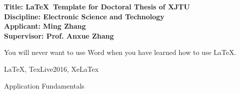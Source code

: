 \vskip-50mm
{\bfseries \xiaosi
	\noindent Title: \LaTeX~Template for Doctoral Thesis of XJTU \\
	\noindent Discipline: Electronic Science and Technology \\
	\noindent Applicant: Ming Zhang \\
	\noindent Supervisor: Prof. Anxue Zhang
}
\vskip22mm

\noindent You will never want to use Word when you have learned how to use \LaTeX.

\vspace{\baselineskip}
 \LaTeX, TexLive2016, XeLaTex

\vspace{\baselineskip}
 Application Fundamentals

\titlespacing{\chapter}{0pt}{-5.3mm}{4.2mm}
\clearpage
